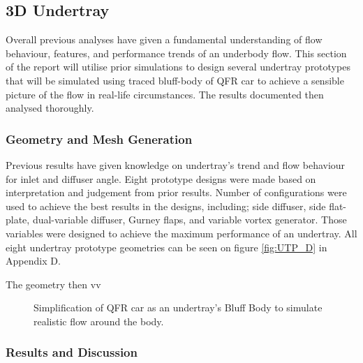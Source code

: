 
\subsection{3D Undertray}
Overall previous analyses have given a fundamental understanding of flow behaviour, features, and performance trends of an underbody flow. This section of the report will utilise prior simulations to design several undertray prototypes that will be simulated using traced bluff-body of QFR car to achieve a sensible picture of the flow in real-life circumstances. The results documented then analysed thoroughly.

\subsubsection{Geometry and Mesh Generation}
\noindent Previous results have given knowledge on undertray's trend and flow behaviour for inlet and diffuser angle. Eight prototype designs were made based on interpretation and judgement from prior results. Number of configurations were used to achieve the best results in the designs, including; side diffuser, side flat-plate, dual-variable diffuser, Gurney flaps, and variable vortex generator. Those variables were designed to achieve the maximum performance of an undertray. All eight undertray prototype geometries can be seen on figure \ref{fig:UTP_D} in Appendix D.

\noindent The geometry then  vv 

\begin{figure}[!htb] %
    \centering
    \noindent{}
    \caption{Simplification of QFR car as an undertray's Bluff Body to simulate realistic flow around the body.}
      \label{fig:3D_UT_BB_SIMPLIFICATION}
\end{figure}
\subsubsection{Results and Discussion}





















